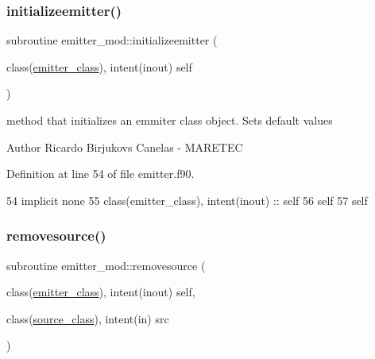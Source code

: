 \subsubsection{\texorpdfstring{initializeemitter()}{initializeemitter()}}
{\footnotesize\ttfamily subroutine emitter\+\_\+mod\+::initializeemitter (\begin{DoxyParamCaption}\item[{class(\mbox{\hyperlink{structemitter__mod_1_1emitter__class}{emitter\+\_\+class}}), intent(inout)}]{self }\end{DoxyParamCaption})\hspace{0.3cm}{\ttfamily [private]}}



method that initializes an emmiter class object. Sets default values 

\begin{DoxyAuthor}{Author}
Ricardo Birjukovs Canelas -\/ M\+A\+R\+E\+T\+EC 
\end{DoxyAuthor}


Definition at line 54 of file emitter.\+f90.


\begin{DoxyCode}
54     \textcolor{keywordtype}{implicit none}
55     \textcolor{keywordtype}{class}(emitter\_class), \textcolor{keywordtype}{intent(inout)} :: self
56     self%
57     self%
\end{DoxyCode}
\mbox{\label{namespaceemitter__mod_a49b704640270da1c4fad50fcd5374376}} 
\subsubsection{\texorpdfstring{removesource()}{removesource()}}
{\footnotesize\ttfamily subroutine emitter\+\_\+mod\+::removesource (\begin{DoxyParamCaption}\item[{class(\mbox{\hyperlink{structemitter__mod_1_1emitter__class}{emitter\+\_\+class}}), intent(inout)}]{self,  }\item[{class(\mbox{\hyperlink{structsources__mod_1_1source__class}{source\+\_\+class}}), intent(in)}]{src }\end{DoxyParamCaption})\hspace{0.3cm}{\ttfamily [private]}}



